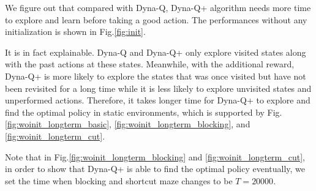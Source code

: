 \documentclass{article}
\begin{document}
    \hspace{0.7em}
    We figure out that compared with Dyna-Q, Dyna-Q+ algorithm needs more time to explore and learn before taking a good action. The performances without any initialization is shown in Fig.\ref{fig:init}.

    \hspace{0.7em}
    It is in fact explainable. Dyna-Q and Dyna-Q+ only explore visited states along with the past actions at these states. Meanwhile, with the additional reward, Dyna-Q+ is more likely to explore the states that was once visited but have not been revisited for a long time while it is less likely to explore unvisited states and unperformed actions. Therefore, it takes longer time for Dyna-Q+ to explore and find the optimal policy in static environments, which is supported by Fig.\ref{fig:woinit_longterm_basic}, \ref{fig:woinit_longterm_blocking}, and \ref{fig:woinit_longterm_cut}. 
    
    \hspace{0.7em}
    Note that in Fig.\ref{fig:woinit_longterm_blocking} and \ref{fig:woinit_longterm_cut}, in order to show that Dyna-Q+ is able to find the optimal policy eventually, we set the time when blocking and shortcut maze changes to be $T=20000$. 

    \begin{figure*}[htbp]
        \centering
        \\
        \\
        \caption{Performances of Dyna-Q+ without initialization}
        \label{fig:init}
    \end{figure*}
\end{document}
